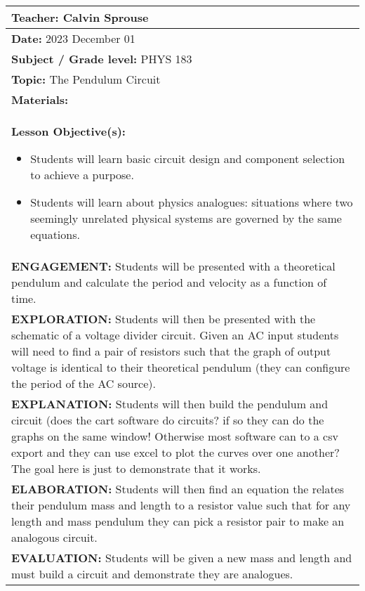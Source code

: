 \documentclass[a4paper, 12pt]{../../config/homework}
\begin{document}
\begin{center}
\begin{tabularx}{\textwidth}{| >{\raggedright\arraybackslash}X |}
\hline
\textbf{Teacher:} Calvin Sprouse
\\\hline

\textbf{Date:} 2023 December 01
\\\hline

\textbf{Subject / Grade level:} PHYS 183
\\\hline

\textbf{Topic:} The Pendulum Circuit
\\\hline

\textbf{Materials:}
\\\hline

\textbf{Lesson Objective(s):}
\begin{itemize}
\item Students will learn basic circuit design and component selection to achieve a purpose.
\item Students will learn about physics analogues: situations where two seemingly unrelated physical systems are governed by the same equations.
\end{itemize}
\\\hline

\textbf{ENGAGEMENT:} Students will be presented with a theoretical pendulum and calculate the period and velocity as a function of time.
\\\hline

\textbf{EXPLORATION:} Students will then be presented with the schematic of a voltage divider circuit. Given an AC input students will need to find a pair of resistors such that the graph of output voltage is identical to their theoretical pendulum (they can configure the period of the AC source).
\\\hline

\textbf{EXPLANATION:} Students will then build the pendulum and circuit (does the cart software do circuits? if so they can do the graphs on the same window! Otherwise most software can to a csv export and they can use excel to plot the curves over one another? The goal here is just to demonstrate that it works.
\\\hline

\textbf{ELABORATION:} Students will then find an equation the relates their pendulum mass and length to a resistor value such that for any length and mass pendulum they can pick a resistor pair to make an analogous circuit.
\\\hline

\textbf{EVALUATION:} Students will be given a new mass and length and must build a circuit and demonstrate they are analogues.
\\\hline

\end{tabularx}
\end{center}
\end{document}
